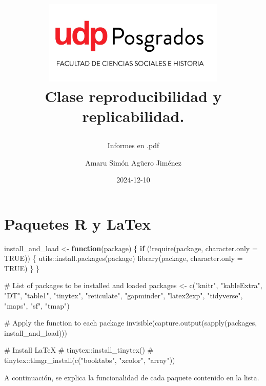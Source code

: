 \documentclass[
  10pt,
]{article}
\title{\begin{center}
  \includegraphics[height=4cm]{logo.png} \\[1cm]
  \Large Clase reproducibilidad y replicabilidad. \\
\end{center}}
\subtitle{Informes en .pdf}
\author{Amaru Simón Agüero Jiménez}
\date{2024-12-10}
\newenvironment{Shaded}{\begin{snugshade}}{\end{snugshade}}
\newcommand{\AttributeTok}[1]{\textcolor[rgb]{0.40,0.45,0.13}{#1}}
\newcommand{\CommentTok}[1]{\textcolor[rgb]{0.37,0.37,0.37}{#1}}
\newcommand{\ConstantTok}[1]{\textcolor[rgb]{0.56,0.35,0.01}{#1}}
\newcommand{\ControlFlowTok}[1]{\textcolor[rgb]{0.00,0.23,0.31}{\textbf{#1}}}
\newcommand{\FunctionTok}[1]{\textcolor[rgb]{0.28,0.35,0.67}{#1}}
\newcommand{\NormalTok}[1]{\textcolor[rgb]{0.00,0.23,0.31}{#1}}
\newcommand{\OtherTok}[1]{\textcolor[rgb]{0.00,0.23,0.31}{#1}}
\newcommand{\SpecialCharTok}[1]{\textcolor[rgb]{0.37,0.37,0.37}{#1}}
\newcommand{\StringTok}[1]{\textcolor[rgb]{0.13,0.47,0.30}{#1}}
\renewcommand*\contentsname{Tabla de contenidos}
\newcommand\contentsname{Tabla de contenidos}
\begin{document}
\maketitle

\renewcommand*\contentsname{Tabla de contenidos}
{
\hypersetup{linkcolor=}
\setcounter{tocdepth}{3}
\tableofcontents
}

\section{Paquetes R y LaTex}\label{paquetes-r-y-latex}

\begin{Shaded}
\begin{Highlighting}[]
\NormalTok{install\_and\_load }\OtherTok{\textless{}{-}} \ControlFlowTok{function}\NormalTok{(package) \{}
  \ControlFlowTok{if}\NormalTok{ (}\SpecialCharTok{!}\FunctionTok{require}\NormalTok{(package, }\AttributeTok{character.only =} \ConstantTok{TRUE}\NormalTok{)) \{}
\NormalTok{    utils}\SpecialCharTok{::}\FunctionTok{install.packages}\NormalTok{(package)}
    \FunctionTok{library}\NormalTok{(package, }\AttributeTok{character.only =} \ConstantTok{TRUE}\NormalTok{)}
\NormalTok{  \}}
\NormalTok{\}}

\CommentTok{\# List of packages to be installed and loaded}
\NormalTok{packages }\OtherTok{\textless{}{-}} \FunctionTok{c}\NormalTok{(}\StringTok{"knitr"}\NormalTok{,}
              \StringTok{"kableExtra"}\NormalTok{, }
              \StringTok{"DT"}\NormalTok{, }
              \StringTok{"table1"}\NormalTok{,}
              \StringTok{"tinytex"}\NormalTok{,}
              \StringTok{"reticulate"}\NormalTok{,}
              \StringTok{"gapminder"}\NormalTok{,}
              \StringTok{"latex2exp"}\NormalTok{,}
              \StringTok{"tidyverse"}\NormalTok{, }
              \StringTok{"maps"}\NormalTok{, }
              \StringTok{"sf"}\NormalTok{, }
              \StringTok{"tmap"}\NormalTok{)}

\CommentTok{\# Apply the function to each package}
\FunctionTok{invisible}\NormalTok{(}\FunctionTok{capture.output}\NormalTok{(}\FunctionTok{sapply}\NormalTok{(packages, install\_and\_load)))}

\CommentTok{\# Install LaTeX}
\CommentTok{\# tinytex::install\_tinytex()}
\CommentTok{\# tinytex::tlmgr\_install(c("booktabs", "xcolor", "array"))}
\end{Highlighting}
\end{Shaded}

A continuación, se explica la funcionalidad de cada paquete contenido en
la lista.
\end{document}
